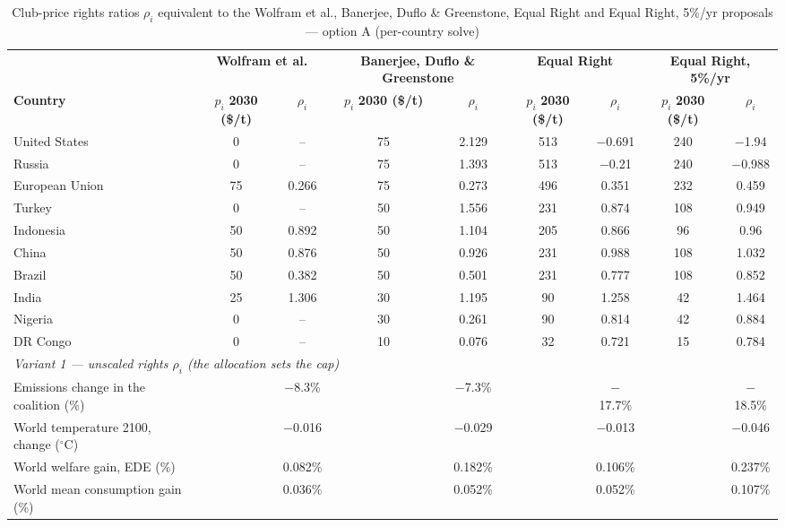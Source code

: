 \begin{table}[htbp]
\centering
\small
\caption{Club-price rights ratios $\rho_i$ equivalent to the Wolfram et al., Banerjee, Duflo \& Greenstone, Equal Right and Equal Right, 5\%/yr proposals --- option A (per-country solve)}
\renewcommand{\arraystretch}{1.15}
\begin{tabular}{lcccccccc}
  \toprule
  & \multicolumn{2}{c}{\textbf{Wolfram et al.}} & \multicolumn{2}{c}{\textbf{Banerjee, Duflo \& Greenstone}} & \multicolumn{2}{c}{\textbf{Equal Right}} & \multicolumn{2}{c}{\textbf{Equal Right, 5\%/yr}} \\
  \cmidrule(lr){2-3} \cmidrule(lr){4-5} \cmidrule(lr){6-7} \cmidrule(lr){8-9}
  \textbf{Country} & $p_i$ \textbf{2030 (\$/t)} & $\rho_i$ & $p_i$ \textbf{2030 (\$/t)} & $\rho_i$ & $p_i$ \textbf{2030 (\$/t)} & $\rho_i$ & $p_i$ \textbf{2030 (\$/t)} & $\rho_i$ \\
  \midrule
  United States & 0 & -- & 75 & 2.129 & 513 & $-$0.691 & 240 & $-$1.94 \\
  Russia & 0 & -- & 75 & 1.393 & 513 & $-$0.21 & 240 & $-$0.988 \\
  European Union & 75 & 0.266 & 75 & 0.273 & 496 & 0.351 & 232 & 0.459 \\
  Turkey & 0 & -- & 50 & 1.556 & 231 & 0.874 & 108 & 0.949 \\
  Indonesia & 50 & 0.892 & 50 & 1.104 & 205 & 0.866 & 96 & 0.96 \\
  China & 50 & 0.876 & 50 & 0.926 & 231 & 0.988 & 108 & 1.032 \\
  Brazil & 50 & 0.382 & 50 & 0.501 & 231 & 0.777 & 108 & 0.852 \\
  India & 25 & 1.306 & 30 & 1.195 & 90 & 1.258 & 42 & 1.464 \\
  Nigeria & 0 & -- & 30 & 0.261 & 90 & 0.814 & 42 & 0.884 \\
  DR Congo & 0 & -- & 10 & 0.076 & 32 & 0.721 & 15 & 0.784 \\
  \midrule
  \multicolumn{9}{l}{\textit{Variant 1 --- unscaled rights $\rho_i$ (the allocation sets the cap)}} \\
  \quad Emissions change in the coalition (\%) &  & $-$8.3\% &  & $-$7.3\% &  & $-$17.7\% &  & $-$18.5\% \\
  \quad World temperature 2100, change ($^\circ$C) &  & $-$0.016 &  & $-$0.029 &  & $-$0.013 &  & $-$0.046 \\
  \quad World welfare gain, EDE (\%) &  & 0.082\% &  & 0.182\% &  & 0.106\% &  & 0.237\% \\
  \quad World mean consumption gain (\%) &  & 0.036\% &  & 0.052\% &  & 0.052\% &  & 0.107\% \\

\end{tabular}
\end{table}
